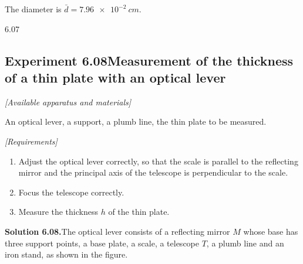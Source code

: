 \noindent The diameter is $\bar d=\SI{7.96e-2}{cm}$.

\begin{figbox}{6.07}
\end{figbox}

\subsection*{Experiment 6.08\quad Measurement of the thickness of a thin plate with an optical lever}

\noindent\textit{[Available apparatus and materials]}

An optical lever, a support, a plumb line, the thin plate to be measured.

\noindent\textit{[Requirements]}
\begin{enumerate}[label=(\arabic*),leftmargin=2.2em,itemsep=1pt,topsep=2pt]
\item Adjust the optical lever correctly, so that the scale is parallel to the reflecting mirror and the principal axis of the telescope is perpendicular to the scale.
\item Focus the telescope correctly.
\item Measure the thickness $h$ of the thin plate.
\end{enumerate}

\medskip
\noindent\textbf{Solution 6.08.}\quad The optical lever consists of a reflecting mirror $M$ whose base has three support points, a base plate, a scale, a telescope $T$, a plumb line and an iron stand, as shown in the figure.

